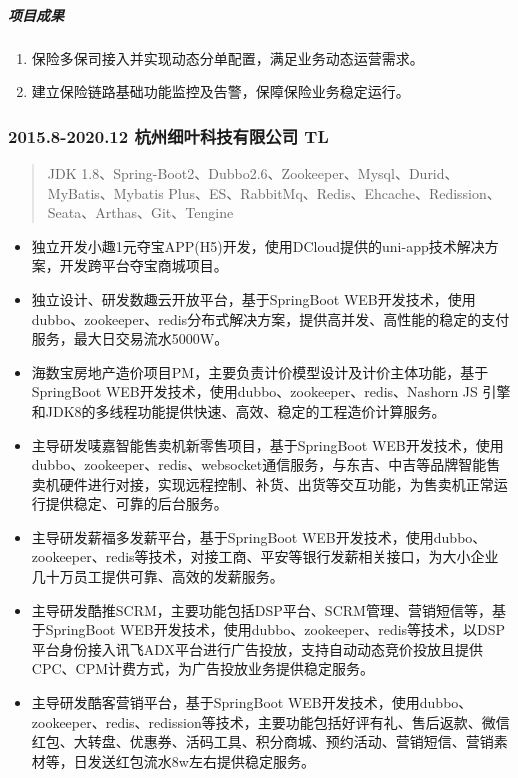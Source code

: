 \subparagraph{项目成果}\label{ux9879ux76eeux6210ux679c-7}

\begin{enumerate}
\def\labelenumi{\arabic{enumi}.}
\tightlist
\item
  保险多保司接入并实现动态分单配置，满足业务动态运营需求。
\item
  建立保险链路基础功能监控及告警，保障保险业务稳定运行。
\end{enumerate}

\subsubsection{2015.8-2020.12 \textbar{} 杭州细叶科技有限公司 \textbar{}
TL}\label{ux676dux5ddeux7ec6ux53f6ux79d1ux6280ux6709ux9650ux516cux53f8-tl}

\begin{quote}
JDK
1.8、Spring-Boot2、Dubbo2.6、Zookeeper、Mysql、Durid、MyBatis、Mybatis
Plus、ES、RabbitMq、Redis、Ehcache、Redission、Seata、Arthas、Git、Tengine
\end{quote}

\begin{itemize}
\tightlist
\item
  独立开发小趣1元夺宝APP(H5)开发，使用DCloud提供的uni-app技术解决方案，开发跨平台夺宝商城项目。
\item
  独立设计、研发数趣云开放平台，基于SpringBoot
  WEB开发技术，使用dubbo、zookeeper、redis分布式解决方案，提供高并发、高性能的稳定的支付服务，最大日交易流水5000W。
\item
  海数宝房地产造价项目PM，主要负责计价模型设计及计价主体功能，基于SpringBoot
  WEB开发技术，使用dubbo、zookeeper、redis、Nashorn JS
  引擎和JDK8的多线程功能提供快速、高效、稳定的工程造价计算服务。
\item
  主导研发唛嘉智能售卖机新零售项目，基于SpringBoot
  WEB开发技术，使用dubbo、zookeeper、redis、websocket通信服务，与东吉、中吉等品牌智能售卖机硬件进行对接，实现远程控制、补货、出货等交互功能，为售卖机正常运行提供稳定、可靠的后台服务。
\item
  主导研发薪福多发薪平台，基于SpringBoot
  WEB开发技术，使用dubbo、zookeeper、redis等技术，对接工商、平安等银行发薪相关接口，为大小企业几十万员工提供可靠、高效的发薪服务。
\item
  主导研发酷推SCRM，主要功能包括DSP平台、SCRM管理、营销短信等，基于SpringBoot
  WEB开发技术，使用dubbo、zookeeper、redis等技术，以DSP平台身份接入讯飞ADX平台进行广告投放，支持自动动态竞价投放且提供CPC、CPM计费方式，为广告投放业务提供稳定服务。
\item
  主导研发酷客营销平台，基于SpringBoot
  WEB开发技术，使用dubbo、zookeeper、redis、redission等技术，主要功能包括好评有礼、售后返款、微信红包、大转盘、优惠券、活码工具、积分商城、预约活动、营销短信、营销素材等，日发送红包流水8w左右提供稳定服务。
\end{itemize}

